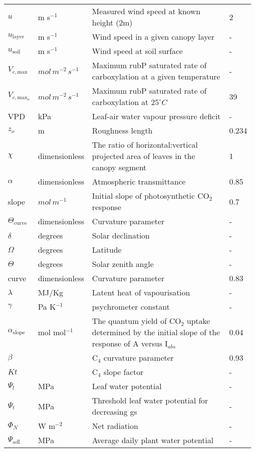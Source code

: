 \documentclass[12pt,fullpage]{report}
\begin{document}
\begin{center}
\begin{longtable}{l l p{3in} p{0.5in}}
$u$	&	m s$^{-1}$	&	Measured wind speed at known height (2m)	&	2	\\
$u_{\text{layer}}$	&	m s$^{-1}$ 	&	Wind speed in a given canopy layer	&	-	\\
$u_{\text{soil}}$	&	m s$^{-1}$ 	&	Wind speed at soil surface	&	-	\\
$V_{c,\text{max}}$	&	$mol\, m^{-2}\, s^{-1}$ 	&	Maximum rubP saturated rate of carboxylation at a given temperature	&	-	\\
$V_{c,\text{max}_o}$	&	$mol\, m^{-2}\, s^{-1}$ 	&	Maximum rubP saturated rate of carboxylation at $25^\circ C$	&	39	\\
VPD	&	kPa	&	Leaf-air water vapour pressure deficit	&	-	\\
$z_o$	&	m	&	Roughness length	&	0.234	\\
$\chi$	&	dimensionless	&	The ratio of horizontal:vertical projected area of leaves in the canopy segment	&	1	\\
$\alpha$	&	dimensionless	&	Atmospheric transmittance	&	0.85	\\
slope	&	$mol\, m^{-1}$ 	&	Initial slope of photosynthetic CO$_2$ response	&	0.7	\\
$\Theta_{\text{curve}}$	&	dimensionless	&	Curvature parameter	&	-	\\
$\delta$	&	degrees	&	Solar declination	&	-	\\
$\Omega$	&	degrees	&	Latitude	&	-	\\
$\Theta$	&	degrees	&	Solar zenith angle	&	-	\\
curve	&	dimensionless	&	Curvature parameter	&	0.83	\\
$\lambda$	&	MJ/Kg	&	Latent heat of vapourisation	&	-	\\
$\gamma$	&	Pa K$^{-1}$	&	psychrometer constant 	&	-	\\
$\alpha_{\text{slope}}$	&	mol mol$^{-1}$ 	&	The quantum yield of CO$_2$ uptake determined by the initial slope of the response of A versus I$_{abs}$	&	0.04	\\
$\beta$	&		&	C$_4$ curvature parameter	&	0.93	\\
$Kt$	&		&	C$_4$ slope factor	&	-	\\
$\Psi_l$	&	MPa	&	Leaf water potential	&	-	\\
$\Psi_t$	&	MPa	&	Threshold leaf water potential for decreasing gs	&	-	\\
$\Phi_N$	&	W m$^{-2}$	&	Net radiation	&	-	\\
$\Psi_{\text{adl}}$	&	MPa	&	Average daily plant water potential	&	-	\\

\end{longtable}
\end{center}
\end{document}
